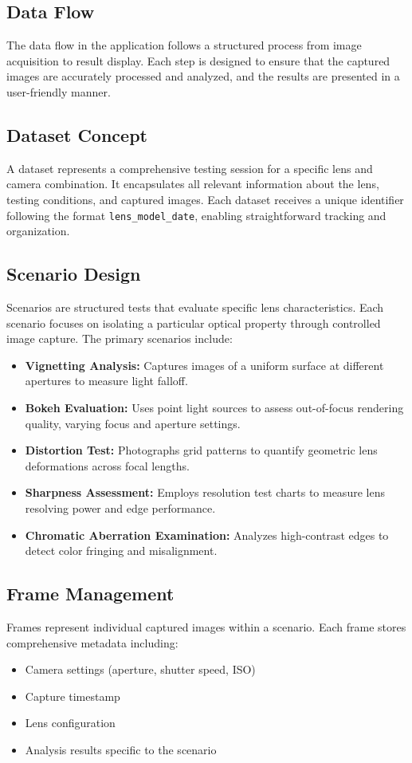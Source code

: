 \subsection{Data Flow}
The data flow in the application follows a structured process from image acquisition to result display. Each step is designed to ensure that the captured images are accurately processed and analyzed, and the results are presented in a user-friendly manner.

\subsection{Dataset Concept}
A dataset represents a comprehensive testing session for a specific lens and camera combination. It encapsulates all relevant information about the lens, testing conditions, and captured images. Each dataset receives a unique identifier following the format \texttt{lens\_model\_date}, enabling straightforward tracking and organization.

\subsection{Scenario Design}
Scenarios are structured tests that evaluate specific lens characteristics. Each scenario focuses on isolating a particular optical property through controlled image capture. The primary scenarios include:
\begin{itemize}
    \item \textbf{Vignetting Analysis:} Captures images of a uniform surface at different apertures to measure light falloff.
    \item \textbf{Bokeh Evaluation:} Uses point light sources to assess out-of-focus rendering quality, varying focus and aperture settings.
    \item \textbf{Distortion Test:} Photographs grid patterns to quantify geometric lens deformations across focal lengths.
    \item \textbf{Sharpness Assessment:} Employs resolution test charts to measure lens resolving power and edge performance.
    \item \textbf{Chromatic Aberration Examination:} Analyzes high-contrast edges to detect color fringing and misalignment.
\end{itemize}

\subsection{Frame Management}
Frames represent individual captured images within a scenario. Each frame stores comprehensive metadata including:
\begin{itemize}
    \item Camera settings (aperture, shutter speed, ISO)
    \item Capture timestamp
    \item Lens configuration
    \item Analysis results specific to the scenario
\end{itemize}

